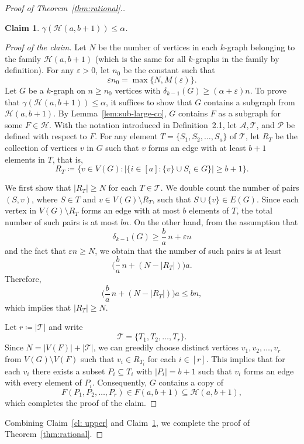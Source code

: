\documentclass[11pt,a4paper]{article}
\newcommand{\op}[1]{\textcolor{red}{OP: #1}}
\newtheorem{claim}[definition]{Claim}
\theoremstyle{remark}
\newenvironment{poc}{\begin{proof}[Proof of the claim]\renewcommand*{\qedsymbol}{$\blacksquare$}}{\end{proof}}
\begin{document}
\begin{proof}[Proof of Theorem~\ref{thm:rational}.]
\begin{claim}\label{cl: lower}
    $\gamma(\mathcal{H}(a,b+1))  \le \alpha$.
\end{claim}   
\begin{poc}
Let $N$ be the number of vertices in each $k$-graph belonging to the family $\mathcal{H}(a,b+1)$ (which is the same for all $k$-graphs in the family by definition). %
For any $\varepsilon >0$, let $n_0$ be the constant such that 
\[\varepsilon n_0 = \max\{ N, M(\varepsilon) \}.\]
Let $G$ be a $k$-graph on $n \ge n_0$ vertices with $\delta_{k-1}(G) \ge (\alpha+\varepsilon)n$.
To prove that $\gamma(\mathcal{H}(a,b+1)) \le \alpha$, it suffices to show that
$G$ 
contains a subgraph from $\mathcal{H}(a,b+1)$.
By Lemma~\ref{lem:sub-large-co}, $G$  contains $F$ as a subgraph for some $F\in \mathcal{H}$. 
With the notation introduced in Definition~2.1, let $\mathcal{A}, \mathcal{T}$, and 
$\mathcal{P}$ be defined with respect to $F$.
For any element $T = \{S_1,S_2,\dots,S_a\}$ of $\mathcal{T}$,
let $R_T$ be the collection of vertices $v$ in $G$ such that $v$ forms an edge with at least $b+1$ elements in $T$, that is,
 \[
 R_T\coloneqq\big\{v\in V(G): |\{i\in [a]: \{v\}\cup S_i\in G\}|\ge b+1\big\}.
 \] 
 
 We first show that $|R_T|\ge N $ for each $T \in \mathcal{T}$. 
We double count the number of pairs $(S,v)$, where $S \in T$ and 
$v \in V(G)\setminus R_T$, such that $S \cup \{v\} \in E(G)$.
Since each vertex in $V(G)\setminus R_T$ forms an edge with at most $b$ 
elements of $T$, the total number of such pairs is at most $bn$.
On the other hand, from the assumption that
\[
\delta_{k-1}(G) \ge \frac{b}{a}\,n + \varepsilon n
\]
and the fact that $\varepsilon n \ge N$, we obtain that the number of such pairs 
is at least
\[
\biggl(\frac{b}{a}\,n + (N - |R_T|)\biggr)a.
\]
Therefore,
\[
\biggl(\frac{b}{a}\,n + (N - |R_T|)\biggr)a \le bn,
\]
which implies that $|R_T| \ge N$.

Let $r\coloneqq|\mathcal{T}|$ and write
\[
\mathcal{T} = \{T_1, T_2, \dots, T_r\}.
\]
Since $N = |V(F)|+ |\mathcal{T}|$, we can greedily choose distinct vertices
$v_1, v_2, \dots, v_r$ from $V(G) \setminus V(F)$ such that $v_i \in R_{T_i}$ for each $i \in [r]$.
This implies that for each $v_i$ there exists a subset
$P_i \subseteq T_i$ with $|P_i| = b+1$ such that $v_i$ forms an edge with
every element of $P_i$.
Consequently, $G$ contains a copy of
\[
F(P_1, P_2, \dots, P_r) \in F(a, b+1)\subseteq\mathcal{H}(a, b+1),
\]
which completes the proof of the claim.
\end{poc}
Combining Claim~\ref{cl: upper} and Claim~\ref{cl: lower}, we complete the proof of Theorem~\ref{thm:rational}.
\end{proof}
\end{document}
